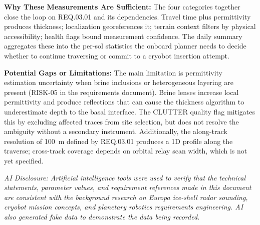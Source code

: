 \documentclass[11pt]{article}
\begin{document}
\noindent\textbf{Why These Measurements Are Sufficient:}
The four categories together close the loop on REQ.03.01 and its dependencies. Travel
time plus permittivity produces thickness; localization georeferences it; terrain context
filters by physical accessibility; health flags bound measurement confidence. The daily
summary aggregates these into the per-sol statistics the onboard planner needs to decide
whether to continue traversing or commit to a cryobot insertion attempt.

\noindent\textbf{Potential Gaps or Limitations:}
The main limitation is permittivity estimation uncertainty when brine inclusions or
heterogeneous layering are present (RISK-05 in the requirements document). Brine lenses
increase local permittivity and produce reflections that can cause the thickness
algorithm to underestimate depth to the basal interface. The CLUTTER quality flag
mitigates this by excluding affected traces from site selection, but does not resolve the
ambiguity without a secondary instrument. Additionally, the along-track resolution of
100~m defined by REQ.03.01 produces a 1D profile along the traverse; cross-track
coverage depends on orbital relay scan width, which is not yet specified.


\vspace{1em}
\noindent\small\textit{AI Disclosure: Artificial intelligence tools were used to verify that the technical 
statements, parameter values, and requirement references made in this document are consistent with the background 
research on Europa ice-shell radar sounding, cryobot mission concepts, and planetary robotics requirements 
engineering. AI also generated fake data to demonstrate the data being recorded.}
\end{document}
